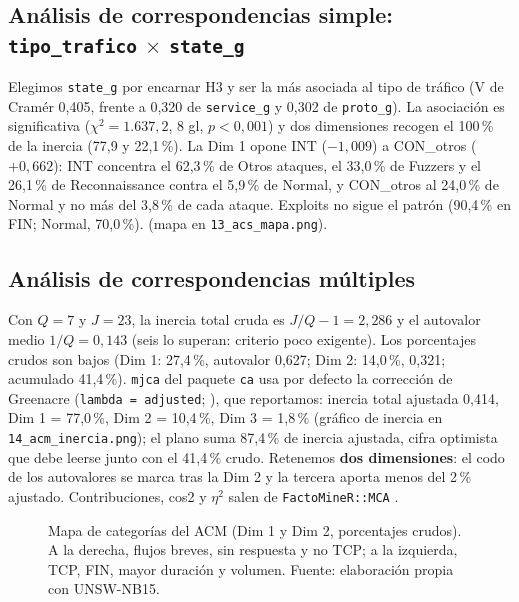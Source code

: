 \subsection{Análisis de correspondencias simple: \texttt{tipo\_trafico} $\times$ \texttt{state\_g}}
Elegimos \texttt{state\_g} por encarnar H3 y ser la más asociada al tipo de tráfico (V de Cramér 0,405, frente a 0,320 de \texttt{service\_g} y 0,302 de \texttt{proto\_g}). La asociación es significativa ($\chi^2 = 1.637{,}2$, 8 gl, $p < 0{,}001$) y dos dimensiones recogen el 100\,\% de la inercia (77,9 y 22,1\,\%). La Dim 1 opone INT ($-1{,}009$) a CON\_otros ($+0{,}662$): INT concentra el 62,3\,\% de Otros ataques, el 33,0\,\% de Fuzzers y el 26,1\,\% de Reconnaissance contra el 5,9\,\% de Normal, y CON\_otros al 24,0\,\% de Normal y no más del 3,8\,\% de cada ataque. Exploits no sigue el patrón (90,4\,\% en FIN; Normal, 70,0\,\%). (mapa en \texttt{13\_acs\_mapa.png}).

\subsection{Análisis de correspondencias múltiples}
Con $Q = 7$ y $J = 23$, la inercia total cruda es $J/Q - 1 = 2{,}286$ y el autovalor medio $1/Q = 0{,}143$ (seis lo superan: criterio poco exigente). Los porcentajes crudos son bajos (Dim 1: 27,4\,\%, autovalor 0,627; Dim 2: 14,0\,\%, 0,321; acumulado 41,4\,\%). \texttt{mjca} del paquete \texttt{ca} \citep{nenadic2007} usa por defecto la corrección de Greenacre (\texttt{lambda = \textquotedbl{}adjusted\textquotedbl{}}; \citealp{greenacre2017}), que reportamos: inercia total ajustada 0,414, Dim 1 = 77,0\,\%, Dim 2 = 10,4\,\%, Dim 3 = 1,8\,\% (gráfico de inercia en \texttt{14\_acm\_inercia.png}); el plano suma 87,4\,\% de inercia ajustada, cifra optimista que debe leerse junto con el 41,4\,\% crudo. Retenemos \textbf{dos dimensiones}: el codo de los autovalores se marca tras la Dim 2 y la tercera aporta menos del 2\,\% ajustado. Contribuciones, cos2 y $\eta^2$ salen de \texttt{FactoMineR::MCA} \citep{le2008,husson2017}.

\begin{figure}[htbp]
  \centering
  \caption[Mapa de categorías del ACM]{Mapa de categorías del ACM (Dim 1 y Dim 2, porcentajes crudos). A la derecha, flujos breves, sin respuesta y no TCP; a la izquierda, TCP, FIN, mayor duración y volumen. Fuente: elaboración propia con UNSW-NB15.}
  \label{fig:acm-mapa}
\end{figure}

